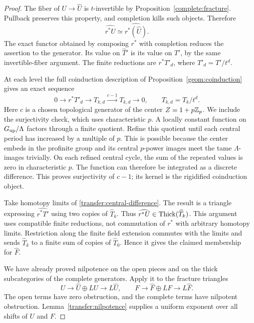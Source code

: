 \begin{proof}
The fiber of $U\to\widehat U$ is $t$-invertible by
Proposition~\ref{complete:fracture}. Pullback preserves this
property, and completion kills such objects. Therefore
\[
 \widehat{r^*U}\simeq\widehat{r^*(\widehat U)}.
\]
The exact functor obtained by composing $r^*$ with completion
reduces the assertion to the generator. Its value on
$\widehat T'$ is its value on $T'$, by the same invertible-fiber
argument. The finite reductions are $r^*T'_d$, where
$T'_d=T'/t^d$.

At each level the full coinduction description of
Proposition~\ref{geom:coinduction} gives an exact sequence
\begin{equation}
 0\longrightarrow r^*T'_d\longrightarrow T_{k,d}
       \xrightarrow{c-1}T_{k,d}\longrightarrow0,
 \qquad T_{k,d}=T_k/t^d.
 \label{transfer:central-difference}
\end{equation}
Here $c$ is a chosen topological generator of the center
$Z=1+p\mathbb Z_p$.
We include the surjectivity check, which uses characteristic $p$.
A locally constant function on $G_{\rm up}/\Lambda$ factors
through a finite quotient. Refine this quotient until each central
period has increased by a multiple of $p$. This is possible because
the center embeds in the profinite group and its central $p$-power
images meet the tame $\Lambda$-images trivially. On each refined
central cycle, the sum of the repeated values is zero in
characteristic $p$. The function can therefore be integrated as a
discrete difference. This proves surjectivity of $c-1$; its kernel
is the rigidified coinduction object.

Take homotopy limits of \eqref{transfer:central-difference}. The
result is a triangle expressing $\widehat{r^*T'}$ using two copies
of $\widehat T_k$. Thus
$\widehat{r^*U}\in\operatorname{Thick}(\widehat T_k)$. This argument uses
compatible finite reductions, not commutation of $r^*$ with
arbitrary homotopy limits. Restriction along the finite field extension
commutes with the limits and sends $\widehat T_k$ to a finite
sum of copies of $\widehat T_0$. Hence it gives the claimed
membership for $\widehat F$.

We have already proved nilpotence on the open pieces and on the thick
subcategories of the complete generators. Apply it to the fracture
triangles
\[
 U\longrightarrow\widehat U\oplus LU
               \longrightarrow L\widehat U,
 \qquad
 F\longrightarrow\widehat F\oplus LF
               \longrightarrow L\widehat F.
\]
The open terms have zero obstruction, and the complete terms have
nilpotent obstruction. Lemma~\ref{transfer:nilpotence} supplies a
uniform exponent over all shifts of $U$ and $F$.
\end{proof}

